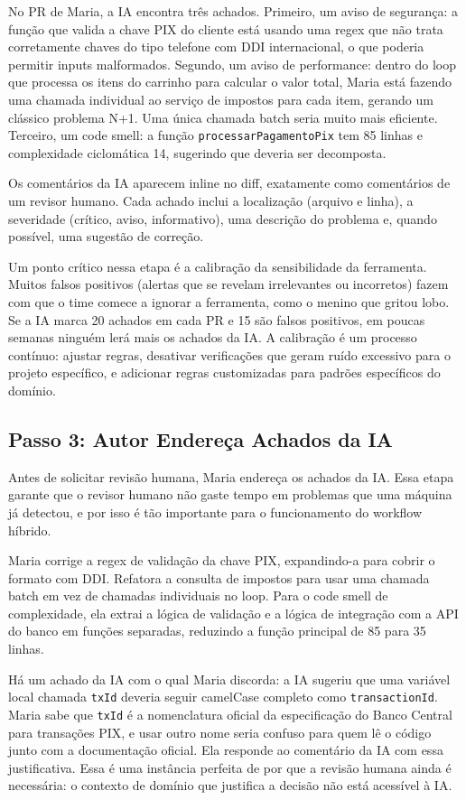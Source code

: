 No PR de Maria, a IA encontra três achados. Primeiro, um aviso de segurança: a
função que valida a chave PIX do cliente está usando uma regex que não trata
corretamente chaves do tipo telefone com DDI internacional, o que poderia permitir
inputs malformados. Segundo, um aviso de performance: dentro do loop que processa
os itens do carrinho para calcular o valor total, Maria está fazendo uma chamada
individual ao serviço de impostos para cada item, gerando um clássico problema N+1.
Uma única chamada batch seria muito mais eficiente. Terceiro, um code smell: a função
\texttt{processarPagamentoPix} tem 85 linhas e complexidade ciclomática 14, sugerindo
que deveria ser decomposta.

Os comentários da IA aparecem inline no diff, exatamente como comentários de um
revisor humano. Cada achado inclui a localização (arquivo e linha), a severidade
(crítico, aviso, informativo), uma descrição do problema e, quando possível, uma
sugestão de correção.

Um ponto crítico nessa etapa é a calibração da sensibilidade da ferramenta. Muitos
falsos positivos (alertas que se revelam irrelevantes ou incorretos) fazem com
que o time comece a ignorar a ferramenta, como o menino que gritou lobo. Se a IA
marca 20 achados em cada PR e 15 são falsos positivos, em poucas semanas ninguém
lerá mais os achados da IA. A calibração é um processo contínuo: ajustar regras,
desativar verificações que geram ruído excessivo para o projeto específico, e
adicionar regras customizadas para padrões específicos do domínio.

\subsection{Passo 3: Autor Endereça Achados da IA}

Antes de solicitar revisão humana, Maria endereça os achados da IA. Essa etapa
garante que o revisor humano não gaste tempo em problemas que uma máquina já detectou,
e por isso é tão importante para o funcionamento do workflow híbrido.

Maria corrige a regex de validação da chave PIX, expandindo-a para cobrir o formato
com DDI. Refatora a consulta de impostos para usar uma chamada batch em vez de
chamadas individuais no loop. Para o code smell de complexidade, ela extrai a lógica
de validação e a lógica de integração com a API do banco em funções separadas,
reduzindo a função principal de 85 para 35 linhas.

Há um achado da IA com o qual Maria discorda: a IA sugeriu que uma variável local
chamada \texttt{txId} deveria seguir camelCase completo como \texttt{transactionId}.
Maria sabe que \texttt{txId} é a nomenclatura oficial da especificação do Banco
Central para transações PIX, e usar outro nome seria confuso para quem lê o código
junto com a documentação oficial. Ela responde ao comentário da IA com essa
justificativa. Essa é uma instância perfeita de por que a revisão humana ainda é
necessária: o contexto de domínio que justifica a decisão não está acessível à IA.

